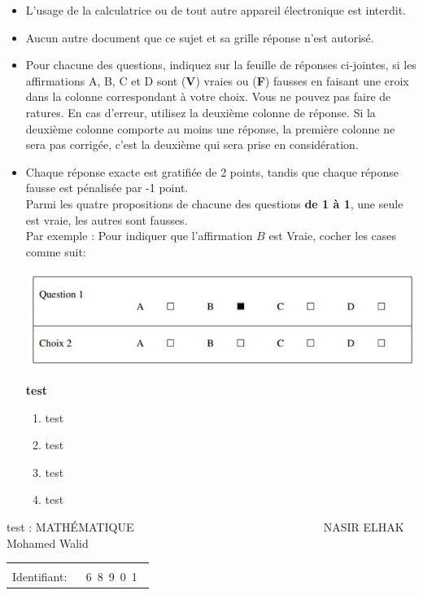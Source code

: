 \documentclass{book}%
\begin{document}
\begin{itemize}%
\item%
L'usage de la calculatrice ou de tout autre appareil électronique est interdit.%
\item%
Aucun autre document que ce sujet et sa grille réponse n'est autorisé.%
\item%
Pour chacune des questions, indiquez sur la feuille de réponses ci-jointes, si les affirmations A, B, C et D sont (\textbf{V}) vraies ou (\textbf{F}) fausses en faisant une croix dans la colonne correspondant à votre choix. Vous ne pouvez pas faire de ratures. En cas d'erreur, utilisez la deuxième colonne de réponse. Si la deuxième colonne comporte au moins une réponse, la première colonne ne sera pas corrigée, c'est la deuxième qui sera prise en considération.%
\item%
Chaque réponse exacte est gratifiée de 2 points, tandis que chaque réponse fausse est pénalisée par -1 point. \\ 	Parmi les quatre propositions de chacune des questions \textbf{de 1 à 1}, une seule est vraie, les autres sont fausses. \\ 	Par exemple : Pour indiquer que l'affirmation $B$ est Vraie, cocher les cases comme suit:  \\ \begin{center}	\includegraphics[scale=0.8]{reponses.png} \end{center}%
\thispagestyle{empty}%
\begin{exercise}%
\textbf{test }%
\begin{enumerate}[label=\textbf{\Alph*. }]%
\item%
test%
\item%
test%
\item%
test%
\item%
test%
\end{enumerate}%
\end{exercise}%
\end{itemize}%
\newpage%
\thispagestyle{empty}%
test : MATHÉMATIQUE $\qquad \qquad \qquad \qquad \qquad \qquad \qquad \qquad$ NASIR ELHAK Mohamed Walid%
\begin{flushright}%
\begin{tabular}{|l|}%
\hline%
 \\%
\thispagestyle{empty}%
Identifiant: $\quad$ {\Large 6~8~9~0~1~}%
 \\%
\hline%
\end{tabular}%
\end{flushright}%
\end{document}
